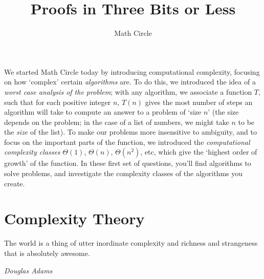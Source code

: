 \documentclass[answers]{exam}
\title{Proofs in Three Bits or Less}
\author{Math Circle}
\begin{document}
\maketitle

We started Math Circle today by introducing computational complexity, focusing on how `complex' certain \emph{algorithms} are. To do this, we introduced the idea of a \emph{worst case analysis of the problem}; with any algorithm, we associate a function $T$, such that for each positive integer $n$, $T(n)$ gives the most number of steps an algorithm will take to compute an answer to a problem of `size $n$' (the size depends on the problem; in the case of a list of numbers, we might take $n$ to be the \emph{size} of the list). To make our problems more insensitive to ambiguity, and to focus on the important parts of the function, we introduced the \emph{computational complexity classes} $\Theta(1)$, $\Theta(n)$, $\Theta(n^2)$, etc, which give the `highest order of growth' of the function. In these first set of questions, you'll find algorithms to solve problems, and investigate the complexity classes of the algorithms you create.


\section{Complexity Theory}

\epigraph{The world is a thing of utter inordinate complexity and richness and strangeness that is absolutely awesome.}{\textit{Douglas Adams}}

\end{document}
